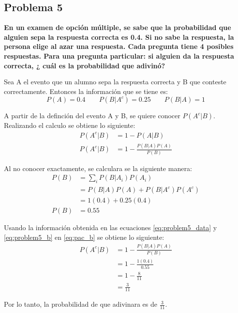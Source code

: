 \pagebreak
\subsection*{Problema 5}
\textbf{En un examen de opción múltiple, se sabe que la probabilidad que alguien sepa la respuesta correcta es 0.4. Si no sabe la respuesta, la persona elige al azar una respuesta. Cada pregunta tiene 4 posibles respuestas. Para una pregunta particular: si alguien da la respuesta correcta, ¿ cuál es la probabilidad que adivinó?}

Sea A el evento que un alumno sepa la respuesta correcta y B que conteste correctamente. Entonces la información que se tiene es:
\begin{equation}
    P(A)     = 0.4 \qquad P(B|A^c) = 0.25 \qquad  P(B|A)   =1
    \label{eq:problem5_data}
\end{equation}

A partir de la definción del evento A y B, se quiere conocer $P(A^c|B)$. Realizando el calculo se obtiene lo siguiente:
\begin{align}
    P(A^c|B) & = 1- P(A|B) \nonumber                         \\
    P(A^c|B) & = 1- \frac{P(B|A)P(A)}{P(B)} \label{eq:pac_b}
\end{align}

Al no conocer exactamente, se calculara se la siguiente manera:
\begin{align}
    P(B) & = \sum_i P(B|A_i)P(A_i) \nonumber     \\
         & = P(B|A)P(A)+P(B|A^c)P(A^c) \nonumber \\
         & = 1(0.4)+ 0.25(0.4) \nonumber         \\
    P(B) & = 0.55
    \label{eq:problem5_b}
\end{align}

Usando la información obtenida en las ecuaciones \ref{eq:problem5_data} y \ref{eq:problem5_b} en \ref{eq:pac_b} se obtiene lo siguiente:
\begin{align*}
    P(A^c|B) & = 1- \frac{P(B|A)P(A)}{P(B)} \\
             & =1-\frac{1(0.4)}{0.55}       \\
             & =1-\frac{8}{11}              \\
             & =\frac{3}{11}
\end{align*}

Por lo tanto, la probabilidad de que adivinara es de $\frac{3}{11}$.